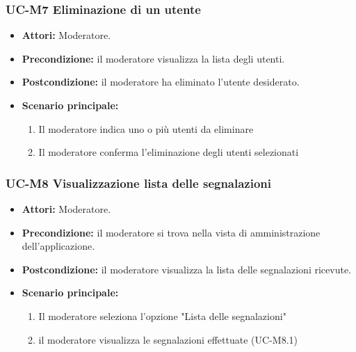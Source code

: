 \subsubsection{UC-M7 Eliminazione di un utente}
\begin{itemize}
	\item \textbf{Attori:} Moderatore.
	\item \textbf{Precondizione:} il moderatore visualizza la lista degli utenti.
	\item \textbf{Postcondizione:} il moderatore ha eliminato l'utente desiderato.
	\item \textbf{Scenario principale:}
	\begin{enumerate}
		\item Il moderatore indica uno o più utenti da eliminare
		\item Il moderatore conferma l'eliminazione degli utenti selezionati
	\end{enumerate}
\end{itemize}

\subsubsection{UC-M8 Visualizzazione lista delle segnalazioni}
\begin{itemize}
	\item \textbf{Attori:} Moderatore.
	\item \textbf{Precondizione:} il moderatore si trova nella vista di amministrazione dell'applicazione.
	\item \textbf{Postcondizione:} il moderatore visualizza la lista delle segnalazioni ricevute.
	\item \textbf{Scenario principale:}
	\begin{enumerate}
		\item Il moderatore seleziona l'opzione "Lista delle segnalazioni"
		\item il moderatore visualizza le segnalazioni effettuate (UC-M8.1)
	\end{enumerate}
\end{itemize}

